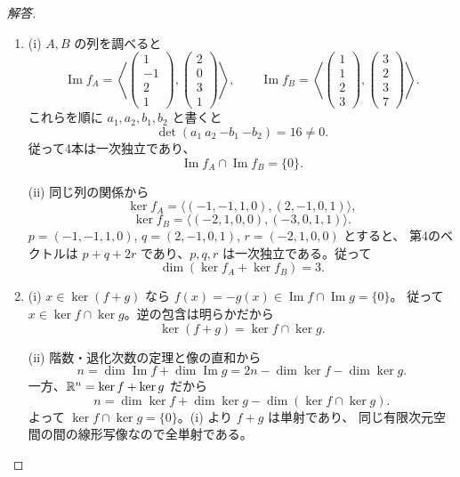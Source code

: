 \begin{proof}[解答]
\begin{enumerate}
  \item[(1)] (i) $A,B$ の列を調べると
  \[
  \operatorname{Im}f_A
  =\left\langle
  \begin{pmatrix}1\\-1\\2\\1\end{pmatrix},
  \begin{pmatrix}2\\0\\3\\1\end{pmatrix}
  \right\rangle,\qquad
  \operatorname{Im}f_B
  =\left\langle
  \begin{pmatrix}1\\1\\2\\3\end{pmatrix},
  \begin{pmatrix}3\\2\\3\\7\end{pmatrix}
  \right\rangle.
  \]
  これらを順に $a_1,a_2,b_1,b_2$ と書くと
  \[
  \det(a_1\ a_2\ {-b_1}\ {-b_2})=16\ne0.
  \]
  従って4本は一次独立であり、
  \[
  \operatorname{Im}f_A\cap\operatorname{Im}f_B=\{0\}.
  \]

  (ii) 同じ列の関係から
  \[
  \ker f_A=\langle(-1,-1,1,0),(2,-1,0,1)\rangle,
  \]
  \[
  \ker f_B=\langle(-2,1,0,0),(-3,0,1,1)\rangle.
  \]
  $p=(-1,-1,1,0)$, $q=(2,-1,0,1)$, $r=(-2,1,0,0)$ とすると、
  第4のベクトルは $p+q+2r$ であり、$p,q,r$ は一次独立である。従って
  \[
  \dim(\ker f_A+\ker f_B)=3.
  \]

  \item[(2)] (i) $x\in\ker(f+g)$ なら
  $f(x)=-g(x)\in\operatorname{Im}f\cap\operatorname{Im}g=\{0\}$。
  従って $x\in\ker f\cap\ker g$。逆の包含は明らかだから
  \[
  \ker(f+g)=\ker f\cap\ker g.
  \]

  (ii) 階数・退化次数の定理と像の直和から
  \[
  n=\dim\operatorname{Im}f+\dim\operatorname{Im}g
  =2n-\dim\ker f-\dim\ker g.
  \]
  一方、$\mathbb{R}^n=\ker f+\ker g$ だから
  \[
  n=\dim\ker f+\dim\ker g-\dim(\ker f\cap\ker g).
  \]
  よって $\ker f\cap\ker g=\{0\}$。(i) より $f+g$ は単射であり、
  同じ有限次元空間の間の線形写像なので全単射である。
\end{enumerate}
\end{proof}

